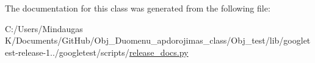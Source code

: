 The documentation for this class was generated from the following file\+:\begin{DoxyCompactItemize}
\item 
C\+:/\+Users/\+Mindaugas K/\+Documents/\+Git\+Hub/\+Obj\+\_\+\+Duomenu\+\_\+apdorojimas\+\_\+class/\+Obj\+\_\+test/lib/googletest-\/release-\/1../googletest/scripts/\mbox{\hyperlink{_obj__test_2lib_2googletest-release-1_88_81_2googletest_2scripts_2release__docs_8py}{release\+\_\+docs.\+py}}\end{DoxyCompactItemize}
